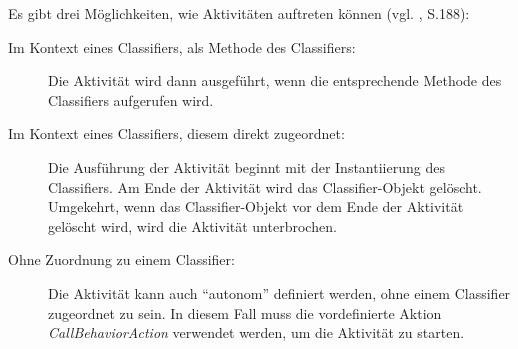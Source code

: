 Es gibt drei Möglichkeiten, wie Aktivitäten auftreten können (vgl. \citep{HitzEtAl2005}, S.188):
\begin{description}
\item[Im Kontext eines Classifiers, als Methode des Classifiers:] Die Aktivität wird dann ausgeführt, wenn die entsprechende Methode des Classifiers aufgerufen wird.
\item[Im Kontext eines Classifiers, diesem direkt zugeordnet:] Die Ausführung der Aktivität beginnt mit der Instantiierung des Classifiers. Am Ende der Aktivität wird das Classifier-Objekt gelöscht. Umgekehrt, wenn das Classifier-Objekt vor dem Ende der Aktivität gelöscht wird, wird die Aktivität unterbrochen.
\item[Ohne Zuordnung zu einem Classifier:] Die Aktivität kann auch ``autonom'' definiert werden, ohne einem Classifier zugeordnet zu sein. In diesem Fall muss die vordefinierte Aktion \emph{CallBehaviorAction} verwendet werden, um die Aktivität zu starten. %
\end{description}



